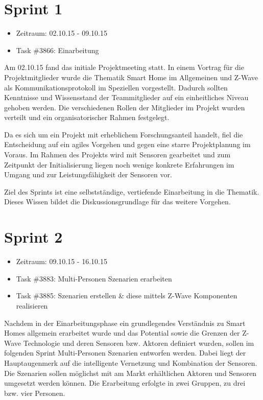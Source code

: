 \documentclass[12pt, oneside, smallheadings]{scrbook}
\begin{document}
\section{Sprint 1}
\begin{itemize}
	\item Zeitraum: 02.10.15 - 09.10.15 \newline
	\item Task \#3866: Einarbeitung\\
\end{itemize}
\noindent
Am 02.10.15 fand das initiale Projektmeeting statt. In einem Vortrag für die Projektmitglieder wurde die Thematik Smart Home im Allgemeinen und Z-Wave als Kommunikationsprotokoll im Speziellen vorgestellt. Dadurch sollten Kenntnisse und Wissensstand der Teammitglieder auf ein einheitliches Niveau gehoben werden. Die verschiedenen Rollen der Mitglieder im Projekt wurden verteilt und ein organisatorischer Rahmen festgelegt.

Da es sich um ein Projekt mit erheblichem Forschungsanteil handelt, fiel die Entscheidung auf ein agiles Vorgehen und gegen eine starre Projektplanung im Voraus. Im Rahmen des Projekts wird mit Sensoren gearbeitet und zum Zeitpunkt der Initialisierung liegen noch wenige konkrete Erfahrungen im Umgang und zur Leistungsfähigkeit der Sensoren vor.

Ziel des Sprints ist eine selbstständige, vertiefende Einarbeitung in die Thematik. Dieses Wissen bildet die Diskussionsgrundlage für das weitere Vorgehen.
\newpage
\section{Sprint 2}
\begin{itemize}
	\item Zeitraum: 09.10.15 - 16.10.15 \newline
	\item Task \#3883: Multi-Personen Szenarien erarbeiten
	\item Task \#3885: Szenarien erstellen \& diese mittels Z-Wave Komponenten realisieren\\
\end{itemize}
\noindent
Nachdem in der Einarbeitungsphase ein grundlegendes Verständnis zu Smart Homes allgemein erarbeitet wurde und das Potential sowie die Grenzen der Z-Wave Technologie und deren Sensoren bzw. Aktoren definiert wurden, sollen im folgenden Sprint Multi-Personen Szenarien entworfen werden. Dabei liegt der Hauptaugenmerk auf die intelligente Vernetzung und Kombination der Sensoren. Die Szenarien sollen möglichst mit am Markt erhältlichen Aktoren und Sensoren umgesetzt werden können. Die Erarbeitung erfolgte in zwei Gruppen, zu drei bzw. vier Personen.
\end{document}
